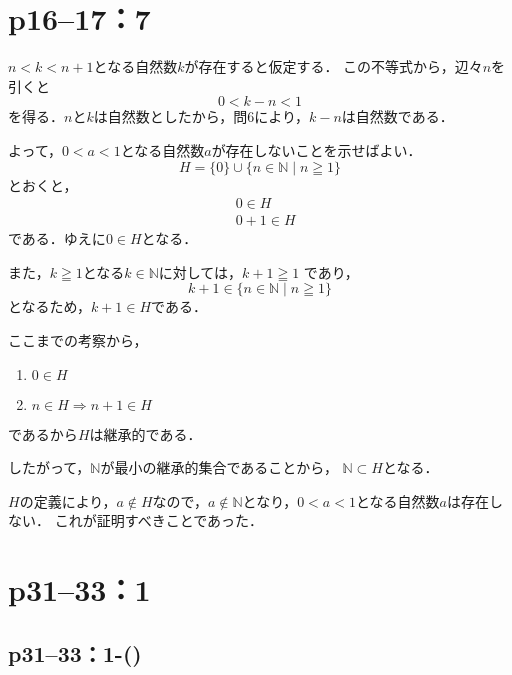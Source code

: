 \newpage

\section*{p16--17：7}

\begin{tproof}
    $n < k < n+1$となる自然数$k$が存在すると仮定する．
    この不等式から，辺々$n$を引くと
    \[
        0 < k - n < 1
    \]
    を得る．$n$と$k$は自然数としたから，問6により，$k-n$は自然数である．

    よって，$0<a<1$となる自然数$a$が存在しないことを示せばよい．
    \[
        H=\{0\} \cup \{n \in \mathbb{N} \mid n \geqq 1 \}
    \]
    とおくと，
    \begin{align*}
         & 0 \in H   \\
         & 0+1 \in H
    \end{align*}
    である．ゆえに$ 0 \in H$となる．

    また，$k \geqq 1$となる$k \in \mathbb{N}$に対しては，$k +1 \geqq 1$
    であり，
    \[
        k+1 \in \{n \in \mathbb{N} \mid n \geqq 1 \}
    \]
    となるため，$k+1 \in H$である．

    ここまでの考察から，
    \begin{enumerate}
        \item $0 \in H$
        \item $n \in H \Longrightarrow n+1 \in H$
    \end{enumerate}
    であるから$H$は継承的である．

    したがって，$\mathbb{N}$が最小の継承的集合であることから，
    $\mathbb{N} \subset H$となる．

    $H$の定義により，$a \notin H$なので，$a \notin \mathbb{N}$となり，$0<a<1$となる自然数$a$は存在しない．
    これが証明すべきことであった．
\end{tproof}

\newpage

\section*{p31--33：1}


\subsection*{p31--33：1-()}

